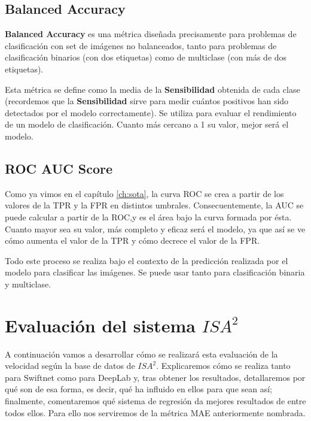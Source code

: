 \subsection{Balanced Accuracy}

\textbf{Balanced Accuracy} es una métrica diseñada precisamente para problemas de clasificación con set de imágenes no balanceados, tanto para problemas de clasificación binarios (con dos etiquetas) como de multiclase (con más de dos etiquetas).

Esta métrica se define como la media de la \textbf{Sensibilidad} obtenida de cada clase (recordemos que la \textbf{Sensibilidad} sirve para medir cuántos positivos han sido detectados por el modelo correctamente). Se utiliza para evaluar el rendimiento de un modelo de clasificación. Cuanto más cercano a 1 su valor, mejor será el modelo. %

\subsection{ROC AUC Score}

Como ya vimos en el capítulo \ref{ch:sota}, la curva \ac{ROC} se crea a partir de los valores de la \ac{TPR} y la \ac{FPR} en distintos umbrales. Consecuentemente, la \ac{AUC} se puede calcular a partir de la \ac{ROC},y es el área bajo la curva formada por ésta. Cuanto mayor sea su valor, más completo y eficaz será el modelo, ya que así se ve cómo aumenta el valor de la \ac{TPR} y cómo decrece el valor de la \ac{FPR}.

Todo este proceso se realiza bajo el contexto de la predicción realizada por el modelo para clasificar las imágenes. Se puede usar tanto para clasificación binaria y multiclase. %

\section{Evaluación del sistema $ISA^{2}$}

A continuación vamos a desarrollar cómo se realizará esta evaluación de la velocidad según la base de datos de $ISA^{2}$. Explicaremos cómo se realiza tanto para Swiftnet como para DeepLab y, tras obtener los resultados, detallaremos por qué son de esa forma, es decir, qué ha influido en ellos para que sean así; finalmente, comentaremos qué sistema de regresión da mejores resultados de entre todos ellos. Para ello nos serviremos de la métrica \ac{MAE} anteriormente nombrada.

